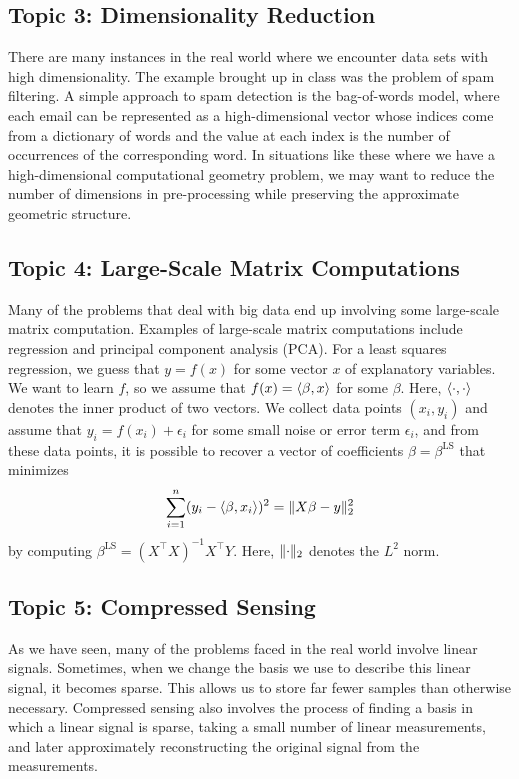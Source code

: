 \documentclass[11pt]{article}
\DeclarePairedDelimiter\inprod{\langle}{\rangle}
\DeclarePairedDelimiter\norm{\lVert}{\rVert}
\begin{document}
\subsection*{Topic 3: Dimensionality Reduction}
There are many instances in the real world where we encounter data sets with high dimensionality. The example brought up in class was the problem of spam filtering. A simple approach to spam detection is the bag-of-words model, where each email can be represented as a high-dimensional vector whose indices come from a dictionary of words and the value at each index is the number of occurrences of the corresponding word. In situations like these where we have a high-dimensional computational geometry problem, we may want to reduce the number of dimensions in pre-processing while preserving the approximate geometric structure.

\subsection*{Topic 4: Large-Scale Matrix Computations}
Many of the problems that deal with big data end up involving some large-scale matrix computation. Examples of large-scale matrix computations include regression and principal component analysis (PCA). For a least squares regression, we guess that $y = f(x)$ for some vector $x$ of explanatory variables. We want to learn $f$, so we assume that $f(x) = \inprod{\beta, x}$ for some $\beta$. Here, $\inprod{\cdot, \cdot}$ denotes the inner product of two vectors. We collect data points $(x_i, y_i)$ and assume that $y_i = f(x_i) + \epsilon_i$ for some small noise or error term $\epsilon_i$, and from these data points, it is possible to recover a vector of coefficients $\beta = \beta^{\mathrm{LS}}$ that minimizes
\[
    \sum_{i = 1}^{n}(y_i - \inprod{\beta, x_i})^2 = \norm{X\beta - y}_2^2
\]
by computing $\beta^{\mathrm{LS}} = (X^\top{}X)^{-1}X^\top{}Y$. Here, $\norm{\cdot}_2$ denotes the $L^2$ norm.

\subsection*{Topic 5: Compressed Sensing}
As we have seen, many of the problems faced in the real world involve linear signals. Sometimes, when we change the basis we use to describe this linear signal, it becomes sparse. This allows us to store far fewer samples than otherwise necessary. Compressed sensing also involves the process of finding a basis in which a linear signal is sparse, taking a small number of linear measurements, and later approximately reconstructing the original signal from the measurements.
\end{document}
